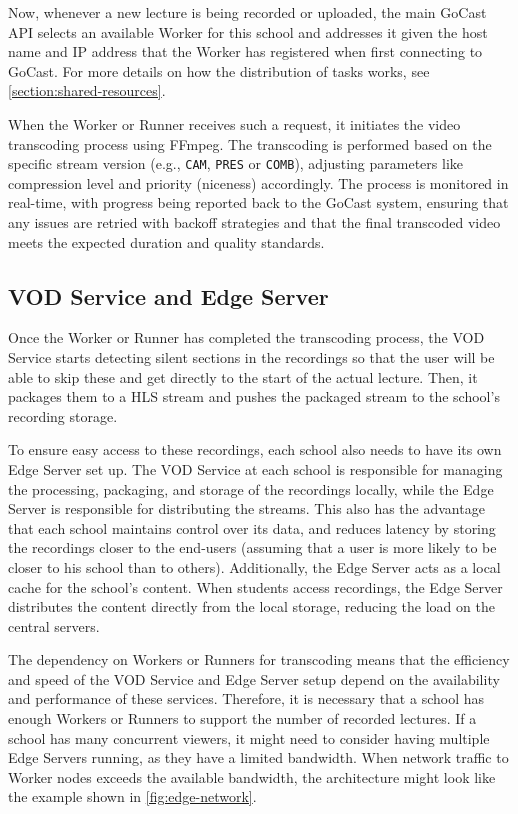 Now, whenever a new lecture is being recorded or uploaded, the main GoCast \ac{API} selects an available Worker for this school and addresses it given the host name and IP address that the Worker has registered when first connecting to GoCast. For more details on how the distribution of tasks works, see \autoref{section:shared-resources}.

When the Worker or Runner receives such a request, it initiates the video transcoding process using FFmpeg. The transcoding is performed based on the specific stream version (e.g., \texttt{CAM}, \texttt{PRES} or \texttt{COMB}), adjusting parameters like compression level and priority (niceness) accordingly. The process is monitored in real-time, with progress being reported back to the GoCast system, ensuring that any issues are retried with backoff strategies and that the final transcoded video meets the expected duration and quality standards.

\subsection{VOD Service and Edge Server}

Once the Worker or Runner has completed the transcoding process, the VOD Service starts detecting silent sections in the recordings so that the user will be able to skip these and get directly to the start of the actual lecture. Then, it packages them to a \ac{HLS} stream and pushes the packaged stream to the school's recording storage.

To ensure easy access to these recordings, each school also needs to have its own Edge Server set up. The VOD Service at each school is responsible for managing the processing, packaging, and storage of the recordings locally, while the Edge Server is responsible for distributing the streams. This also has the advantage that each school maintains control over its data, and reduces latency by storing the recordings closer to the end-users (assuming that a user is more likely to be closer to his school than to others).
Additionally, the Edge Server acts as a local cache for the school's content. When students access recordings, the Edge Server distributes the content directly from the local storage, reducing the load on the central servers.

The dependency on Workers or Runners for transcoding means that the efficiency and speed of the VOD Service and Edge Server setup depend on the availability and performance of these services. Therefore, it is necessary that a school has enough Workers or Runners to support the number of recorded lectures.
If a school has many concurrent viewers, it might need to consider having multiple Edge Servers running, as they have a limited bandwidth. %
When network traffic to Worker nodes exceeds the available bandwidth, the architecture might look like the example shown in \autoref{fig:edge-network}.

